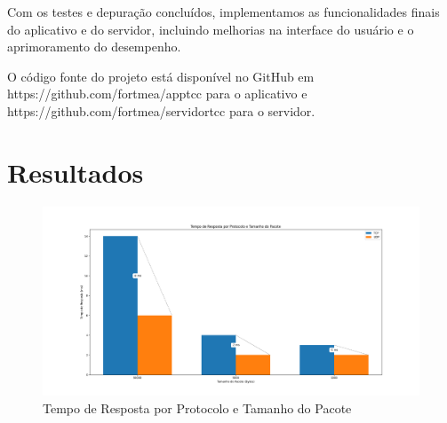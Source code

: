 \documentclass[12pt]{article}
\begin{document}
Com os testes e depuração concluídos, implementamos as funcionalidades finais do aplicativo e do servidor, incluindo melhorias na interface do usuário e o aprimoramento do desempenho.

O código fonte do projeto está disponível no GitHub em  https://github.com/fortmea/apptcc para o aplicativo e https://github.com/fortmea/servidortcc para o servidor.

\section{Resultados}

\begin{figure}[ht]
\centering
\includegraphics[width=1\textwidth]{grafico_ms.png}
\caption{Tempo de Resposta por Protocolo e Tamanho do Pacote}
\label{fig:cronogramafig}
\end{figure}



\end{document}
